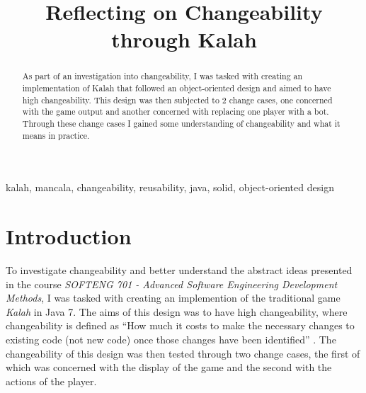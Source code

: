 \documentclass[10pt, a4paper, conference]{IEEEtran}
\begin{document}
\title{Reflecting on Changeability through Kalah}

\author{
}

\maketitle

\begin{abstract}
  As part of an investigation into changeability, I was tasked with creating an
  implementation of Kalah that followed an object-oriented design and aimed to
  have high changeability. This design was then subjected to 2 change cases,
  one concerned with the game output and another concerned with replacing one
  player with a bot. Through these change cases I gained some understanding of
  changeability and what it means in practice.
\end{abstract}

\begin{IEEEkeywords}
kalah, mancala, changeability, reusability, java, solid, object-oriented design
\end{IEEEkeywords}

\section{Introduction}
To investigate changeability and better understand the abstract ideas presented
in the course \textit{SOFTENG 701 - Advanced Software Engineering Development
Methods}, I was tasked with creating an implemention of the traditional game
\textit{Kalah} in Java 7. The aims of this design was to have high
changeability, where changeability is defined as ``How much it costs to make
the necessary changes to existing code (not new code) once those changes have
been identified'' \cite{lec01b-changeability}. The changeability of this design
was then tested through two change cases, the first of which was concerned with
the display of the game and the second with the actions of the player.
\end{document}
